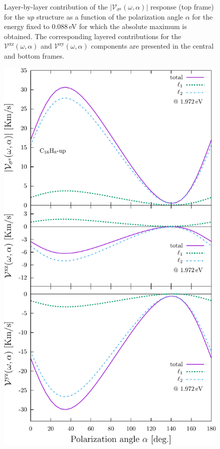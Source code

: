 \documentclass[prb,11pt,tightenlines,twocolumn,aps]{revtex4-1}
\begin{document}
\begin{figure}[t]
    \caption{Layer-by-layer contribution of the
    $|\mathcal{V}_{\sigma^{\mathrm{z}}}(\omega,\alpha)|$ response (top frame)
    for the \emph{up} structure as a function of the polarization angle $\alpha$
    for the energy fixed to 0.088\,eV for which the absolute maximum is
    obtained.
    The corresponding layered contributions for the
    $\mathcal{V}^{\mathrm{xz}}(\omega,\alpha)$ and
    $\mathcal{V}^{\mathrm{zy}}(\omega,\alpha)$ components are presented in the
    central and bottom frames.}
    \label{fig:up-vsz-lay-1}
\end{figure}

\begin{figure}[t]
    \centering
    \includegraphics[width=\linewidth]{upplots/up-svaz-lay-2}
    

\end{figure}
\end{document}

